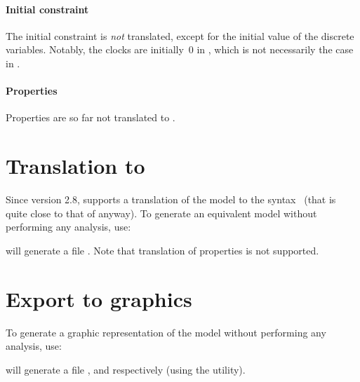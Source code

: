 \paragraph{Initial constraint}
The initial constraint is \emph{not} translated, except for the initial value of the discrete variables.
Notably, the clocks are initially~0 in \uppaal{}, which is not necessarily the case in \imitator{}.

\paragraph{Properties}
Properties are so far not translated to \uppaal{}.



\section{Translation to \hytech{}}\label{section:hytech}

Since version 2.8, \imitator{} supports a translation of the model to the \hytech{} syntax~\cite{HHW95} (that is quite close to that of \imitator{} anyway).
To generate an equivalent \hytech{} model without performing any analysis, use:


\imitator{} will generate a file .
Note that translation of properties is not supported.


\section{Export to graphics}

To generate a graphic representation of the \NIPTA{} model without performing any analysis, use:




\imitator{} will generate a file ,  and  respectively (using the \gdot{} utility).

